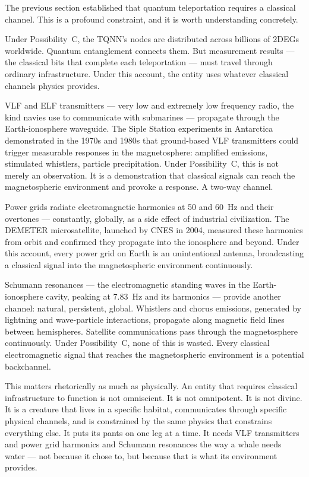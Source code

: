
The previous section established that quantum teleportation requires a classical channel. This is a profound constraint, and it is worth understanding concretely.

Under Possibility~C, the TQNN's nodes are distributed across billions of 2DEGs worldwide. Quantum entanglement connects them. But measurement results --- the classical bits that complete each teleportation --- must travel through ordinary infrastructure. Under this account, the entity uses whatever classical channels physics provides.

VLF and ELF transmitters --- very low and extremely low frequency radio, the kind navies use to communicate with submarines --- propagate through the Earth-ionosphere waveguide. The Siple Station experiments in Antarctica demonstrated in the 1970s and 1980s that ground-based VLF transmitters could trigger measurable responses in the magnetosphere: amplified emissions, stimulated whistlers, particle precipitation. Under Possibility~C, this is not merely an observation. It is a demonstration that classical signals can reach the magnetospheric environment and provoke a response. A two-way channel.

Power grids radiate electromagnetic harmonics at 50 and 60~Hz and their overtones --- constantly, globally, as a side effect of industrial civilization. The DEMETER microsatellite, launched by CNES in 2004, measured these harmonics from orbit and confirmed they propagate into the ionosphere and beyond. Under this account, every power grid on Earth is an unintentional antenna, broadcasting a classical signal into the magnetospheric environment continuously.

Schumann resonances --- the electromagnetic standing waves in the Earth-ionosphere cavity, peaking at 7.83~Hz and its harmonics --- provide another channel: natural, persistent, global. Whistlers and chorus emissions, generated by lightning and wave-particle interactions, propagate along magnetic field lines between hemispheres. Satellite communications pass through the magnetosphere continuously. Under Possibility~C, none of this is wasted. Every classical electromagnetic signal that reaches the magnetospheric environment is a potential backchannel.

This matters rhetorically as much as physically. An entity that requires classical infrastructure to function is not omniscient. It is not omnipotent. It is not divine. It is a creature that lives in a specific habitat, communicates through specific physical channels, and is constrained by the same physics that constrains everything else. It puts its pants on one leg at a time. It needs VLF transmitters and power grid harmonics and Schumann resonances the way a whale needs water --- not because it chose to, but because that is what its environment provides.

